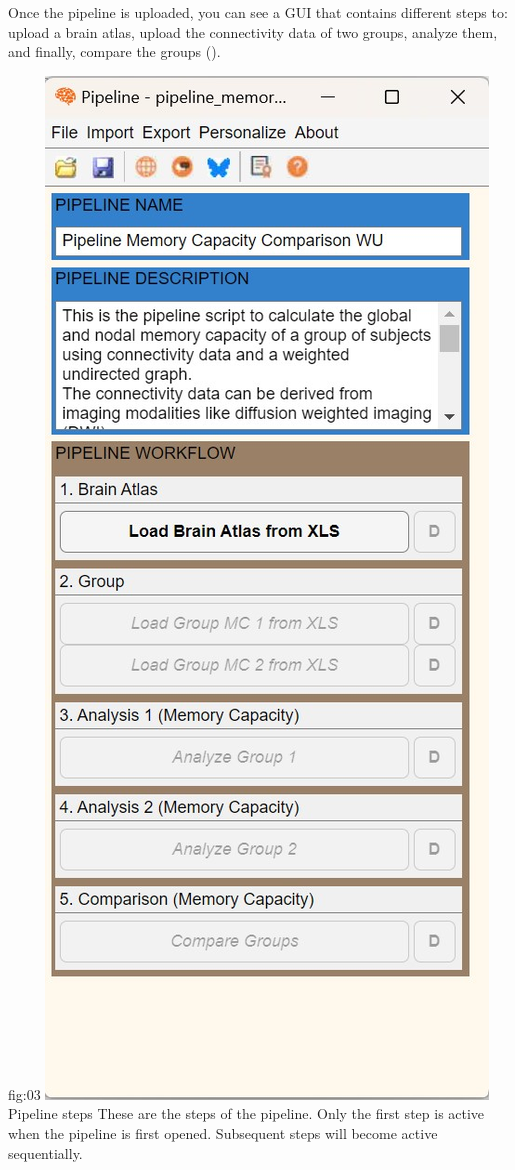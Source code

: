 \documentclass[justified]{tufte-handout}
\begin{document}
Once the pipeline is uploaded, you can see a GUI that contains different steps to: upload a brain atlas, upload the connectivity data of two groups, analyze them, and finally, compare the groups (). 

{fig:03}
{
	\includegraphics{fig03.jpg}
}
{Pipeline steps}
{
	These are the steps of the pipeline. Only the first step is active when the pipeline is first opened. Subsequent steps will become active sequentially.
}
\end{document}
